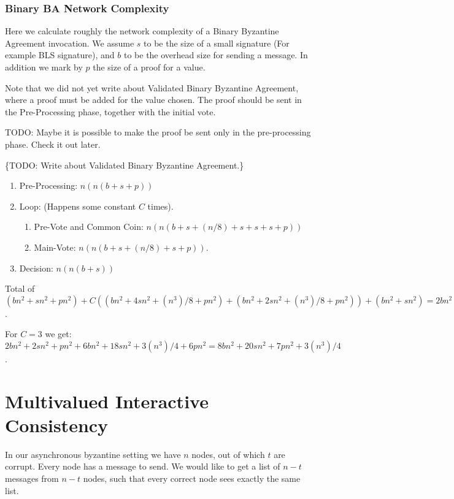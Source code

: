 \subsubsection{Binary BA Network Complexity}

Here we calculate roughly the network complexity of a Binary Byzantine Agreement
invocation. We assume $s$ to be the size of a small signature (For example BLS
signature), and $b$ to be the overhead size for sending a message. In addition
we mark by $p$ the size of a proof for a value.

Note that we did not yet write about Validated Binary Byzantine Agreement, where
a proof must be added for the value chosen. The proof should be sent in the
Pre-Processing phase, together with the initial vote. 

TODO: Maybe it is possible to make the proof be sent only in the pre-processing
phase. Check it out later.

\{TODO: Write about Validated Binary Byzantine Agreement.\}

\begin{enumerate}
  \item Pre-Processing: $n(n(b + s + p))$
  \item Loop: (Happens some constant $C$ times).
  \begin{enumerate}
    \item Pre-Vote and Common Coin: $n(n(b + s + (n/8) + s + s + s + p))$
    \item Main-Vote: $n(n(b + s + (n/8) + s + p))$.
  \end{enumerate}
  \item Decision: $n(n(b + s))$
\end{enumerate}

Total of $(bn^2 + sn^2 + pn^2) + 
C((bn^2 + 4sn^2 + (n^3)/8 + pn^2) + (bn^2 +
2sn^2 + (n^3)/8 + pn^2)) + (bn^2 + sn^2) = 
2bn^2 + 2sn^2 + pn^2 + C(2bn^2 + 6sn^2 + (n^3)/4 + 2pn^2)$.

For $C = 3$ we get: $2bn^2 + 2sn^2 + pn^2 + 6bn^2 + 18sn^2 + 3(n^3)/4 + 6pn^2 =
8bn^2 + 20sn^2 + 7pn^2 + 3(n^3)/4$.

\section{Multivalued Interactive Consistency}

In our asynchronous byzantine setting we have $n$ nodes, out of which $t$ are
corrupt. Every node has a message to send. We would like to get a list of $n-t$
messages from $n-t$ nodes, such that every correct node sees exactly the same
list.

